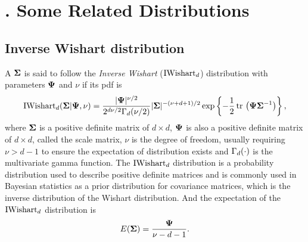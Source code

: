 \section{$\!\!\!\!\!\!\!$. Some Related Distributions}      %

\subsection{Inverse Wishart distribution}\label{zyf.four.sec:NIW}       %

A \trv ${\mbox{\boldmath$\Sigma$}}$ is said to follow the \textit{Inverse Wishart} ($\mbox{IWishart}_d$) distribution with parameters ${\mbox{\boldmath$\Psi$}}$ and $\nu$ if its pdf is
\begin{eqnarray*}
    \mbox{IWishart}_d({\mbox{\boldmath$\Sigma$}} | {\mbox{\boldmath$\Psi$}}, \nu) = \frac{|{\mbox{\boldmath$\Psi$}}|^{\nu/2}}{2^{d\nu/2} \Gamma_d(\nu/2)} |{\mbox{\boldmath$\Sigma$}}|^{-(\nu + d + 1)/2} \exp\left\{-\frac{1}{2}\mbox{$\,$tr$\,$}\left({\mbox{\boldmath$\Psi$}}{\mbox{\boldmath$\Sigma$}}^{-1}\right)\right\},
\end{eqnarray*}
where ${\mbox{\boldmath$\Sigma$}}$ is a positive definite matrix of $d \times d$, ${\mbox{\boldmath$\Psi$}}$ is also a positive definite matrix of $d \times d$, called the scale matrix, $\nu$ is the degree of freedom, usually requiring $\nu > d - 1$ to ensure the expectation of distribution exists and $\Gamma_d(\cdot)$ is the multivariate gamma function. The $\mbox{IWishart}_d$ distribution is a probability distribution used to describe positive definite matrices and is commonly used in Bayesian statistics as a prior distribution for covariance matrices, which is the inverse distribution of the Wishart distribution. And the expectation of the $\mbox{IWishart}_d$ distribution is
\begin{eqnarray*}
    E({\mbox{\boldmath$\Sigma$}}) = \frac{{\mbox{\boldmath$\Psi$}}}{\nu - d - 1}. 
\end{eqnarray*}